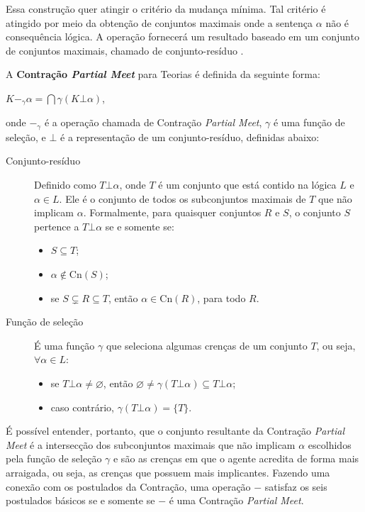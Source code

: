 Essa construção quer atingir o critério da mudança mínima. Tal critério é atingido por meio da obtenção de conjuntos maximais onde a sentença $ \alpha $ não é consequência lógica. A operação fornecerá um resultado baseado em um conjunto de conjuntos maximais, chamado de conjunto-resíduo \citep{revisaoCobe}.

A \textbf{Contração \textit{Partial Meet}} para Teorias é definida da seguinte forma: 

\begin{center}
	$ K -_{\gamma} \alpha = \bigcap \gamma(K \bot \alpha) $,
\end{center}

onde $ -_{\gamma} $ é a operação chamada de Contração \textit{Partial Meet}, $ \gamma $ é uma função de seleção, e $ \bot $ é a representação de um conjunto-resíduo, definidas abaixo:

\begin{description}
	\item[Conjunto-resíduo] Definido como $ T \bot \alpha $, onde $ T $ é um conjunto que está contido na lógica $ L $ e $ \alpha \in L $. Ele é o conjunto de todos os subconjuntos maximais de $ T $ que não implicam $ \alpha $. Formalmente, para quaisquer conjuntos $ R $ e $ S $, o conjunto $ S $ pertence a $ T \bot \alpha $ se e somente se:
	\begin{itemize}
		\item $ S \subseteq T $;
		\item $ \alpha \notin \text{Cn}(S) $;
		\item se $ S \subsetneq R \subseteq T $, então $ \alpha \in \text{Cn}(R)$, para todo $R$.
	\end{itemize}
	\item[Função de seleção] É uma função $ \gamma $ que seleciona algumas crenças de um conjunto $ T $, ou seja, $ \forall \alpha \in L $:
	\begin{itemize}
		\item se $ T \bot \alpha \neq \varnothing $, então $ \varnothing \neq \gamma(T \bot \alpha) \subseteq T \bot \alpha $;
		\item caso contrário, $ \gamma(T \bot \alpha) = \{T\} $.
	\end{itemize}
\end{description}

É possível entender, portanto, que o conjunto resultante da Contração \textit{Partial Meet} é a intersecção dos subconjuntos maximais que não implicam $ \alpha $ escolhidos pela função de seleção $ \gamma $ e são as crenças em que o agente acredita de forma mais arraigada, ou seja, as crenças que possuem mais implicantes. Fazendo uma conexão com os postulados da Con\-tra\-ção, uma operação $ - $ satisfaz os seis postulados básicos se e somente se $ - $ é uma Contração \textit{Partial Meet}.

